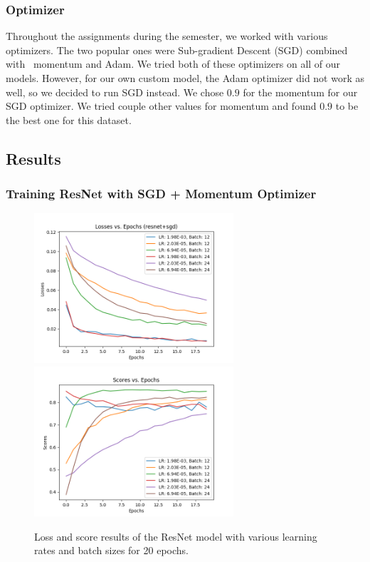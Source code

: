 \documentclass[11pt]{ieeeconf}
\begin{document}
\subsubsection{Optimizer}
Throughout the assignments during the semester, we worked with various optimizers. The two popular ones were Sub-gradient Descent (SGD) combined with  momentum and Adam. We tried both of these optimizers on all of our models. However, for our own custom model, the Adam optimizer did not work as well, so we decided to run SGD instead. We chose $0.9$ for the momentum for our SGD optimizer. We tried couple other values for momentum and found $0.9$ to be the best one for this dataset.

\subsection{Results}

\subsubsection{Training ResNet with SGD + Momentum Optimizer}
\begin{figure}[h]
  \centering
  \includegraphics[width=20em]{resnet_sgd_Losses_20e.png}
  \includegraphics[width=20em]{resnet_sgd_Scores_20e.png}
  \caption{Loss and score results of the ResNet model with various learning rates and batch sizes for 20 epochs.}
  \label{fig:resnet}
\end{figure}
\end{document}
